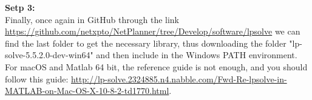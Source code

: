 \textbf{Setp 3:}\\
Finally, once again in GitHub through the link \url{https://github.com/netxpto/NetPlanner/tree/Develop/software/lpsolve} we can find the last folder to get the necessary library, thus downloading the folder "lp-solve-5.5.2.0-dev-win64" and then include in the Windows PATH environment. \\

For macOS  and Matlab 64 bit, the reference guide is not enough, and you should follow this guide: \url{http://lp-solve.2324885.n4.nabble.com/Fwd-Re-lpsolve-in-MATLAB-on-Mac-OS-X-10-8-2-td1770.html}.

